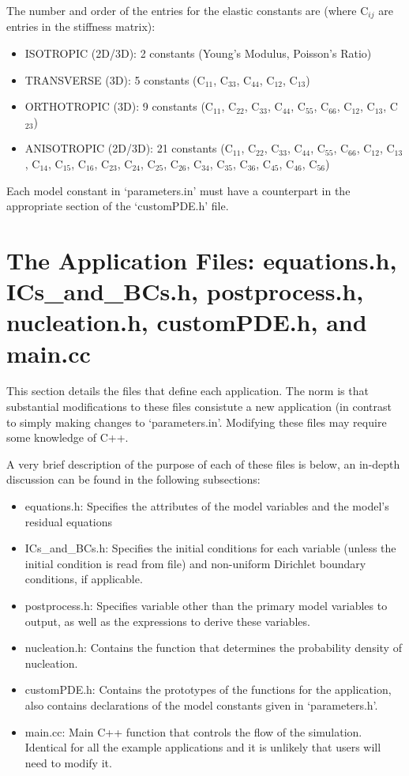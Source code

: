 \documentclass[10pt]{article} %
\begin{document}
The number and order of the entries for the elastic constants are (where C$_{ij}$ are entries in the stiffness matrix):
\begin{itemize}
\item ISOTROPIC (2D/3D): 2 constants (Young's Modulus, Poisson's Ratio)
\item TRANSVERSE (3D): 5 constants (C$_{11}$, C$_{33}$, C$_{44}$, C$_{12}$, C$_{13}$)
\item ORTHOTROPIC (3D): 9 constants (C$_{11}$, C$_{22}$, C$_{33}$, C$_{44}$, C$_{55}$, C$_{66}$, C$_{12}$, C$_{13}$, C$_{23}$)
\item ANISOTROPIC (2D/3D): 21 constants (C$_{11}$, C$_{22}$, C$_{33}$, C$_{44}$, C$_{55}$, C$_{66}$, C$_{12}$, C$_{13}$, C$_{14}$, C$_{15}$, C$_{16}$, C$_{23}$, C$_{24}$, C$_{25}$, C$_{26}$, C$_{34}$, C$_{35}$, C$_{36}$, C$_{45}$, C$_{46}$, C$_{56}$)
\end{itemize}

Each model constant in `parameters.in' must have a counterpart in the appropriate section of the `customPDE.h' file. 



\section{The Application Files: equations.h, ICs\_and\_BCs.h, postprocess.h, nucleation.h, customPDE.h, and main.cc} \label{app_files}
This section details the files that define each application. The norm is that substantial modifications to these files consistute a new application (in contrast to simply making changes to `parameters.in'. Modifying these files may require some knowledge of C++.

A very brief description of the purpose of each of these files is below, an in-depth discussion can be found in the following subsections:
\begin{itemize}
\item equations.h: Specifies the attributes of the model variables and the model's residual equations
\item ICs\_and\_BCs.h: Specifies the initial conditions for each variable (unless the initial condition is read from file) and non-uniform Dirichlet boundary conditions, if applicable.
\item postprocess.h: Specifies variable other than the primary model variables to output, as well as the expressions to derive these variables.
\item nucleation.h: Contains the function that determines the probability density of nucleation.
\item customPDE.h: Contains the prototypes of the functions for the application, also contains declarations of the model constants given in `parameters.h'.
\item main.cc: Main C++ function that controls the flow of the simulation. Identical for all the example applications and it is unlikely that users will need to modify it.
\end{itemize}
\end{document}
